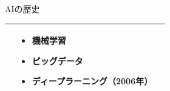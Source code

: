 \documentclass[dvipdfmx,aspectratio=169]{beamer}
\begin{document}
\begin{frame}[shrink]{AIの歴史}
\begin{table}[h]
\begin{tabular}{lp{35em}p{40em}}
										& \begin{minipage}{35em}
											\begin{itemize}
												\item \alert{機械学習}
												\item \alert{ビッグデータ}
												\item \alert{ディープラーニング}（2006年）
											\end{itemize}
										\end{minipage}\\
				\bottomrule                                                                                                      
			\end{tabular}
		\end{table}
	\end{frame}
	
\end{document}
